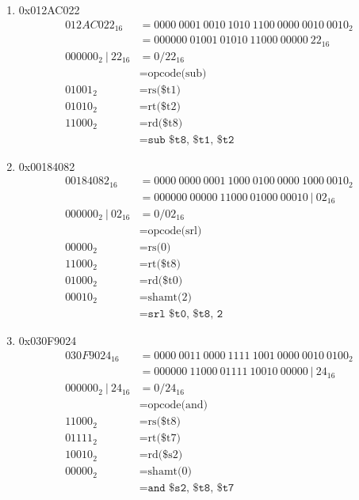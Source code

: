 \documentclass[12pt]{article}
\begin{document}
\begin{enumerate}
\begin{enumerate}
      \item 0x012AC022
      \begin{align*}
        012AC022_{16} &= 0000 \ 0001 \ 0010 \ 1010 \ 1100 \ 0000 \ 0010 \ 0010_2\\
        &= 000000 \ 01001 \ 01010 \ 11000 \ 00000 \ 22_{16}\\
        000000_2 \ | \ 22_{16} &= 0/22_{16}\\
        &= \text{opcode(sub)}\\
        01001_2 &= \text{rs(\$t1)} \\
        01010_2 &= \text{rt(\$t2)} \\
        11000_2 &= \text{rd(\$t8)} \\
        &= \texttt{sub \$t8, \$t1, \$t2}
      \end{align*}

      \item 0x00184082
      \begin{align*}
        00184082_{16} &= 0000 \ 0000 \ 0001 \ 1000 \ 0100 \ 0000 \ 1000 \ 0010_2\\
        &= 000000 \ 00000 \ 11000 \ 01000 \ 00010 \ | \ 02_{16}\\
        000000_2 \ | \ 02_{16} &= 0/02_{16}\\
        &= \text{opcode(srl)}\\
        00000_2 &= \text{rs(0)} \\
        11000_2 &= \text{rt(\$t8)} \\
        01000_2 &= \text{rd(\$t0)} \\
        00010_2 &= \text{shamt(2)} \\
        &= \texttt{srl \$t0, \$t8, 2}
      \end{align*}

      \item 0x030F9024
      \begin{align*}
        030F9024_{16} &= 0000 \ 0011 \ 0000 \ 1111 \ 1001 \ 0000 \ 0010 \ 0100_2\\
        &= 000000 \ 11000 \ 01111 \ 10010 \ 00000 \ | \ 24_{16}\\
        000000_2 \ | \ 24_{16} &= 0/24_{16}\\
        &= \text{opcode(and)}\\
        11000_2 &= \text{rs(\$t8)} \\
        01111_2 &= \text{rt(\$t7)} \\
        10010_2 &= \text{rd(\$s2)} \\
        00000_2 &= \text{shamt(0)} \\
        &= \texttt{and \$s2, \$t8, \$t7}
      \end{align*}

    \end{enumerate}

  \end{enumerate}
\end{document}
